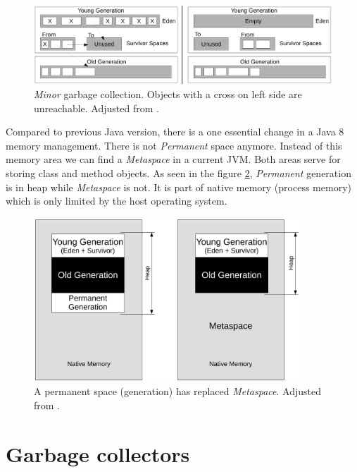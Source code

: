 \documentclass[
  digital, %
  oneside,
  notable, %
  nolof,     %
  nolot     %
]{fithesis3}
\begin{document}
\begin{figure}[h]
	\centering
	\includegraphics[width=13cm]{fig/minor.pdf}
	\caption{\textit{Minor} garbage collection. Objects with a cross on left side are unreachable. Adjusted from \cite{hunt}.}
	\label{minor}
\end{figure}

Compared to previous Java version, there is a one essential change in a Java 8 memory management. There is not \textit{Permanent} space anymore. Instead of this memory area we can find a \textit{Metaspace} in a current JVM. Both areas serve for storing class and method objects. As seen in the figure \ref{metaspace}, \textit{Permanent} generation is in heap while \textit{Metaspace} is not. It is part of native memory (process memory) which is only limited by the host operating system. \cite{metaspace}

\begin{figure}[h]
	\centering
	\includegraphics[width=10cm]{fig/metaspace.pdf}
	\caption{A permanent space (generation) has replaced \textit{Metaspace}. Adjusted from \cite{metaspace}.}
	\label{metaspace}
\end{figure}



\section{Garbage collectors}
\end{document}
